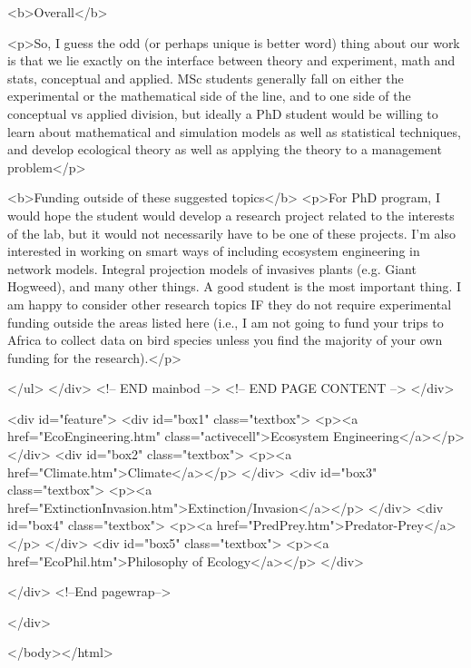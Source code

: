 <b>Overall</b>

<p>So, I guess the odd (or perhaps unique is better word) thing about our work is that we lie exactly on the interface between theory and experiment, math and stats, conceptual and applied. MSc students generally fall on either the experimental or the mathematical side of the line, and to one side of the conceptual vs applied division, but ideally a PhD student would be willing to learn about mathematical and simulation models as well as statistical techniques, and develop ecological theory as well as applying the theory to a management problem</p>

<b>Funding outside of these suggested topics</b>
<p>For PhD program, I would hope the student would develop a research project related to the interests of the lab, but it would not necessarily have to be one of these projects. I'm also interested in working on smart ways of including ecosystem engineering in network models. Integral projection models of invasives plants (e.g. Giant Hogweed), and many other things. A good student is the most important thing. I am happy to consider other research topics IF they do not require experimental funding outside the areas listed here (i.e., I am not going to fund your trips to Africa to collect data on bird species unless you find the majority of your own funding for the research).</p>




</ul>
</div> <!--  END mainbod -->
	<!--  END PAGE CONTENT -->
</div>

<div id="feature">
  <div id="box1" class="textbox">
    <p><a href="EcoEngineering.htm" class="activecell">Ecosystem Engineering</a></p>
  </div>
  <div id="box2" class="textbox">
    <p><a href="Climate.htm">Climate</a></p>
  </div>
  <div id="box3" class="textbox">
    <p><a href="ExtinctionInvasion.htm">Extinction/Invasion</a></p>
  </div>
  <div id="box4" class="textbox">
    <p><a href="PredPrey.htm">Predator-Prey</a></p>
  </div>
  <div id="box5" class="textbox">
    <p><a href="EcoPhil.htm">Philosophy of Ecology</a></p>
  </div>
  

</div> <!--End pagewrap-->

</div>


</body></html>